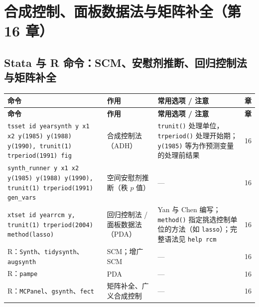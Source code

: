 \section{合成控制、面板数据法与矩阵补全（第 16 章）}\label{sec:UappB-scm}

\subsection{Stata 与 R 命令：SCM、安慰剂推断、回归控制法与矩阵补全}

{\renewcommand{\arraystretch}{1.12}\begin{longtable}{@{}>{\raggedright\arraybackslash\small}p{5.3cm}>{\raggedright\arraybackslash\small}p{3.8cm}>{\raggedright\arraybackslash\small}p{5.3cm}>{\centering\arraybackslash\small}p{0.9cm}@{}}
\toprule
\textbf{命令} & \textbf{作用} & \textbf{常用选项 / 注意} & \textbf{章}\\
\midrule
\endfirsthead
\toprule
\textbf{命令} & \textbf{作用} & \textbf{常用选项 / 注意} & \textbf{章}\\
\midrule
\endhead
\bottomrule
\endlastfoot

\texttt{tsset id year}\newline \texttt{synth y x1 x2 y(1985) y(1988) y(1990), trunit(1) trperiod(1991) fig}\newline {\footnotesize\rmfamily [SSC]} & 合成控制法（ADH） & \texttt{trunit()} 处理单位，\texttt{trperiod()} 处理开始期；\texttt{y(1985)} 等为作预测变量的处理前结果 & 16\\
\addlinespace[1pt]
\texttt{synth\_runner y x1 x2 y(1985) y(1988) y(1990), trunit(1) trperiod(1991) gen\_vars}\newline {\footnotesize\rmfamily [SSC]} & 空间安慰剂推断（秩 $p$ 值） & — & 16\\
\addlinespace[1pt]
\texttt{xtset id year}\newline \texttt{rcm y, trunit(1) trperiod(2004) method(lasso)}\newline {\footnotesize\rmfamily [SSC]} & 回归控制法 / 面板数据法（PDA） & Yan 与 Chen 编写；\texttt{method()} 指定挑选控制单位的方法（如 \texttt{lasso}）；完整语法见 \texttt{help rcm} & 16\\
\addlinespace[1pt]
R：\texttt{Synth}、\texttt{tidysynth}、\texttt{augsynth} & SCM；增广 SCM & — & 16\\
\addlinespace[1pt]
R：\texttt{pampe} & PDA & — & 16\\
\addlinespace[1pt]
R：\texttt{MCPanel}、\texttt{gsynth}、\texttt{fect} & 矩阵补全、广义合成控制 & — & 16\\
\end{longtable}}


